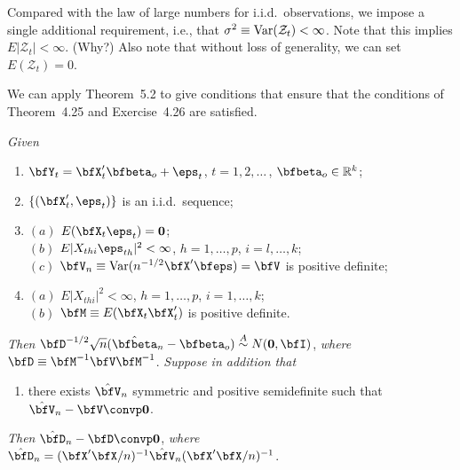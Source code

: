 Compared with the law of large numbers for i.i.d.\ observations, we impose a single additional requirement, i.e., that $\sigma^2 \equiv \operatorname{Var}(\mathcal{Z}_t) < \infty$. Note that this implies $E|\mathcal{Z}_t| < \infty$. (Why?) Also note that without loss of generality, we can set $E(\mathcal{Z}_t) = 0$.

We can apply Theorem~5.2 to give conditions that ensure that the conditions of Theorem~4.25 and Exercise~4.26 are satisfied.

\begin{theorem}\label{thm:ols-iid-clt}
\textit{Given}
\begin{enumerate}
\item[$(i)$] $\bfY_t = \bfX_t'\bfbeta_o + \eps_t$, \quad $t = 1, 2, \ldots$\,, $\bfbeta_o \in \mathbb{R}^k$;
\item[$(ii)$] $\{(\bfX_t', \eps_t)\}$ is an i.i.d.\ sequence;
\item[$(iii)$] $(a)$ $E(\bfX_t \eps_t) = \mathbf{0}$;\\
$(b)$ $E|X_{thi}\eps_{th}|^2 < \infty$, $h = 1, \ldots, p$, $i = l, \ldots, k$;\\
$(c)$ $\bfV_n \equiv \Var(n^{-1/2}\bfX'\bfeps) = \bfV$ is positive definite;
\item[$(iv)$] $(a)$ $E|X_{thi}|^2 < \infty$, $h = 1, \ldots, p$, $i = 1, \ldots, k$;\\
$(b)$ $\bfM \equiv E(\bfX_t \bfX_t')$ is positive definite.
\end{enumerate}

\textit{Then} $\bfD^{-1/2}\sqrt{n}(\hat{\bfbeta}_n - \bfbeta_o) \overset{A}{\sim} N(\mathbf{0}, \bfI)$, \textit{where} $\bfD \equiv \bfM^{-1}\bfV\bfM^{-1}$. \textit{Suppose in addition that}

\begin{enumerate}
\item[$(v)$] there exists $\hat{\bfV}_n$ symmetric and positive semidefinite such that $\hat{\bfV}_n - \bfV \convp \mathbf{0}$.
\end{enumerate}

\textit{Then} $\hat{\bfD}_n - \bfD \convp \mathbf{0}$, \textit{where} $\hat{\bfD}_n = (\bfX'\bfX/n)^{-1}\hat{\bfV}_n(\bfX'\bfX/n)^{-1}$.
\end{theorem}

